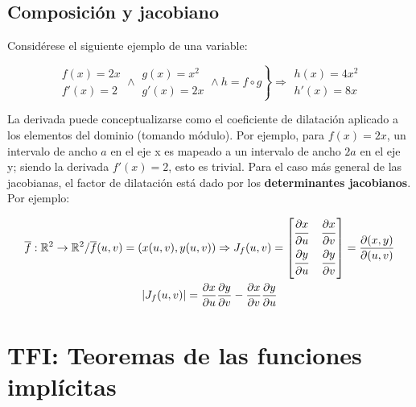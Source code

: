 \documentclass{article}
\renewcommand{\Bbb}{\mathbb}
\begin{document}
\subsection{Composición y jacobiano}

Considérese el siguiente ejemplo de una variable:

\begin{equation}
\left.
\begin{array}{ll}
f(x) = 2x \\
f'(x) = 2
\end{array}
\wedge
\begin{array}{ll}
g(x) = x^2 \\
g'(x) = 2x
\end{array}
\wedge
h = f \circ g
\right\} \Rightarrow
\begin{array}{ll}
h(x) = 4x^2 \\
h'(x) = 8x
\end{array}
\end{equation}

La derivada puede conceptualizarse como el coeficiente de dilatación aplicado a los elementos del dominio (tomando módulo).
Por ejemplo, para $f(x) = 2x$, un intervalo de ancho $a$ en el eje x es mapeado a un intervalo de ancho $2a$ en el eje y; siendo la derivada $f'(x)=2$, esto es trivial. Para el caso más general de las jacobianas, el factor de dilatación está dado por los \textbf{determinantes jacobianos}. Por ejemplo:

\begin{subequations}
\begin{gather}
\overline{f}:\Bbb R^2 \rightarrow \Bbb R^2 / \overline{f}(u,v) = (x(u,v), y(u,v)) \Rightarrow J_f(u,v) =
\begin{bmatrix}
\dfrac{\strut \partial x}{\strut \partial u} & \dfrac{\strut \partial x}{\strut \partial v} \\
\dfrac{\strut \partial y}{\strut \partial u} & \dfrac{\strut \partial y}{\strut \partial v}
\end{bmatrix} = \frac{\partial(x,y)}{\partial(u,v)} \\
|J_f(u,v)| = \frac{\partial x}{\partial u} \frac{\partial y}{\partial v} - \frac{\partial x}{\partial v} \frac{\partial y}{\partial u}
\end{gather}
\end{subequations}

\section{TFI: Teoremas de las funciones implícitas}
\end{document}
